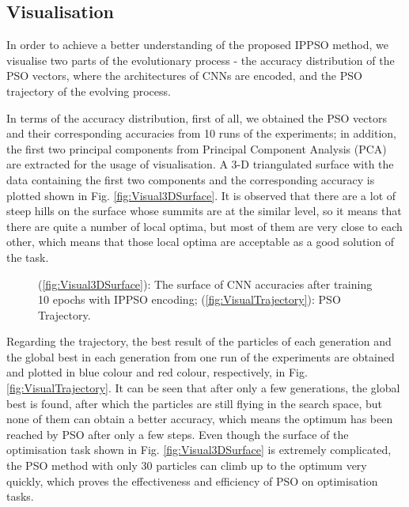 \documentclass[conference]{IEEEtran}
\begin{document}
\subsection{Visualisation}\label{sec:Visulisation}

In order to achieve a better understanding of the proposed IPPSO method, we visualise two parts of the evolutionary process - the accuracy distribution of the PSO vectors, where the architectures of CNNs are encoded, and the PSO trajectory of the evolving process.


In terms of the accuracy distribution, first of all, we obtained the PSO vectors and their corresponding accuracies from 10 runs of the experiments; in addition, the first two principal components from Principal Component Analysis (PCA) are extracted for the usage of visualisation. A 3-D triangulated surface with the data containing the first two components and the corresponding accuracy is plotted shown in Fig. \ref{fig:Visual3DSurface}. It is observed that there are a lot of steep hills on the surface whose summits are at the similar level, so it means that there are quite a number of local optima, but most of them are very close to each other, which means that those local optima are acceptable as a good solution of the task.


\begin{figure}[!htp]
	\centering
	\hfil

	\caption{(\ref{fig:Visual3DSurface}): The surface of CNN accuracies after training 10 epochs with IPPSO encoding; (\ref{fig:VisualTrajectory}): PSO Trajectory.}
\end{figure}

Regarding the trajectory, the best result of the particles of each generation and the global best in each generation from one run of the experiments are obtained and plotted in blue colour and red colour, respectively, in Fig. \ref{fig:VisualTrajectory}. It can be seen that after only a few generations, the global best is found, after which the particles are still flying in the search space, but none of them can obtain a better accuracy, which means the optimum has been reached by PSO after only a few steps. Even though the surface of the optimisation task shown in Fig. \ref{fig:Visual3DSurface} is extremely complicated, the PSO method with only 30 particles can climb up to the optimum very quickly, which proves the effectiveness and efficiency of PSO on optimisation tasks.
\end{document}
